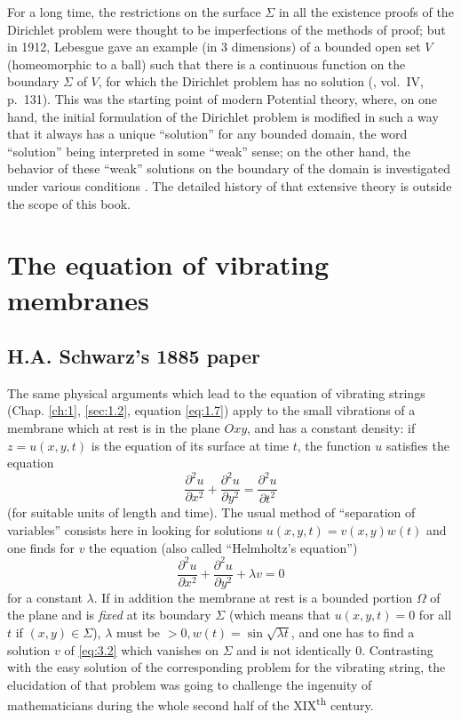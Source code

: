 \documentclass[12pt,a4paper,leqno,twoside]{extbook}
\newcommand{\supth}{\texorpdfstring{\textsuperscript{th}}{th}}
\begin{document}
For a long time, the restrictions on the surface \(\Sigma\) in all the existence proofs of the Dirichlet problem were thought to be imperfections of the methods of proof; but in 1912, Lebesgue gave an example (in 3 dimensions) of a bounded open set \(V\) (homeomorphic to a ball) such that there is a continuous function on the boundary \(\Sigma\) of \(V\), for which the Dirichlet problem has no solution (\cite{138}, vol.~IV, p.~131). This was the starting point of modern Potential theory, where, on one hand, the initial formulation of the Dirichlet problem is modified in such a way that it always has a unique ``solution'' for any bounded domain, the word ``solution'' being interpreted in some ``weak'' sense; on the other hand, the behavior of these ``weak'' solutions on the boundary of the domain is investigated under various conditions \cite{030}. The detailed history of that extensive theory is outside the scope of this book.

\chapter{The equation of vibrating membranes}
\label{ch:3}
\setcounter{equation}{0}

\section{H.A. Schwarz's 1885 paper}
\label{sec:3.1}

The same physical arguments which lead to the equation of vibrating strings (Chap. \ref{ch:1}, \ref{sec:1.2}, equation \eqref{eq:1.7}) apply to the small vibrations of a membrane which at rest is in the plane \(Oxy\), and has a constant density: if \(z = u(x, y, t)\) is the equation of its surface at time \(t\), the function \(u\) satisfies the equation
\begin{equation}
    \label{eq:3.1}
    \frac{\partial^2 u}{\partial x^2} + \frac{\partial^2 u}{\partial y^2} = \frac{\partial^2 u}{\partial t^2}
\end{equation}
(for suitable units of length and time). The usual method of ``separation of variables'' consists here in looking for solutions \(u(x, y, t) = v(x, y)w(t)\) and one finds for \(v\) the equation (also called ``Helmholtz's equation'')
\begin{equation}
    \label{eq:3.2}
    \frac{\partial^2 u}{\partial x^2} + \frac{\partial^2 u}{\partial y^2} + \lambda v = 0
\end{equation}
for a constant \(\lambda\). If in addition the membrane at rest is a bounded portion \(\Omega\) of the plane and is \emph{fixed} at its boundary \(\Sigma\) (which means that \(u(x, y, t) = 0\) for all \(t\) if \((x,y) \in \Sigma\)), \(\lambda\) must be \(> 0, w(t) = \sin \sqrt{\lambda t}\), and one has to find a solution \(v\) of \eqref{eq:3.2} which vanishes on \(\Sigma\) and is not identically 0. Contrasting with the easy solution of the corresponding problem for the vibrating string, the elucidation of that problem was going to challenge the ingenuity of mathematicians during the whole second half of the XIX\supth{} century.
\end{document}
